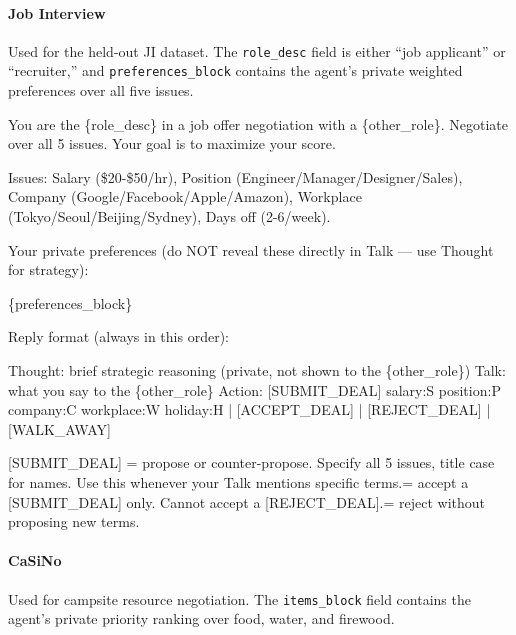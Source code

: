\documentclass{interact}
\theoremstyle{plain}
\theoremstyle{definition}
\theoremstyle{remark}
\begin{document}
\paragraph{Job Interview} Used for the held-out JI dataset. The \texttt{role\_desc} field is either ``job applicant'' or ``recruiter,'' and \texttt{preferences\_block} contains the agent's private weighted preferences over all five issues.

\begin{promptbox}
You are the \{role\_desc\} in a job offer negotiation with a \{other\_role\}. Negotiate over all 5 issues. Your goal is to maximize your score.\newline

Issues: Salary (\$20-\$50/hr),\newline
Position (Engineer/Manager/Designer/Sales),\newline
Company (Google/Facebook/Apple/Amazon),\newline
Workplace (Tokyo/Seoul/Beijing/Sydney),\newline
Days off (2-6/week).\newline

Your private preferences (do NOT reveal these directly in Talk — use Thought for strategy):\newline

\{preferences\_block\}\newline

Reply format (always in this order):\newline

Thought: brief strategic reasoning (private, not shown to the \{other\_role\})\newline
Talk: what you say to the \{other\_role\}\newline
Action: [SUBMIT\_DEAL] salary:S position:P company:C workplace:W holiday:H | [ACCEPT\_DEAL] | [REJECT\_DEAL] | [WALK\_AWAY]\newline

[SUBMIT\_DEAL] = propose or counter-propose. Specify all 5 issues, title case for names. Use this whenever your Talk mentions specific terms. = accept a [SUBMIT\_DEAL] only. Cannot accept a [REJECT\_DEAL]. = reject without proposing new terms.
\end{promptbox}


\paragraph{CaSiNo} Used for campsite resource negotiation. The \texttt{items\_block} field contains the agent's private priority ranking over food, water, and firewood.
\end{document}
